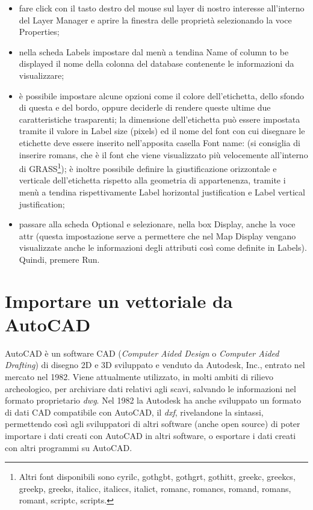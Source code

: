 		\begin{itemize}
			\item fare click con il tasto destro del mouse sul layer di nostro interesse all'interno del Layer Manager e aprire la finestra delle proprietà selezionando la voce \textsf{Properties};
			\item nella scheda \textsf{Labels} impostare dal menù a tendina \textsf{Name of column to be displayed} il nome della colonna del database contenente le informazioni da visualizzare;
			\item è possibile impostare alcune opzioni come il colore dell'etichetta, dello sfondo di questa e del bordo, oppure deciderle di rendere queste ultime due caratteristiche trasparenti; la dimensione dell'etichetta può essere impostata tramite il valore in \textsf{Label size (pixels)} ed il nome del font con cui disegnare le etichette deve essere inserito nell'apposita casella \textsf{Font name:} (si consiglia di inserire \textsf{romans}, che è il font che viene visualizzato più velocemente all'interno di GRASS\footnote{Altri font disponibili sono cyrilc, gothgbt, gothgrt, gothitt, greekc, greekcs, greekp, greeks, italicc, italiccs, italict, romanc, romancs, romand, romans, romant, scriptc, scripts.}); è inoltre possibile definire la giustificazione orizzontale e verticale dell'etichetta rispetto alla geometria di appartenenza, tramite i menù a tendina rispettivamente \textsf{Label horizontal justification} e \textsf{Label vertical justification};
			\item passare alla scheda \textsf{Optional} e selezionare, nella box \textsf{Display}, anche la voce \textsf{attr} (questa impostazione serve a permettere che nel Map Display vengano visualizzate anche le informazioni degli attributi così come definite in \textsf{Labels}). Quindi, premere \textsf{Run}.
		\end{itemize}

\section{Importare un vettoriale da AutoCAD}
	AutoCAD è un software CAD (\emph{Computer Aided Design} o \emph{Computer Aided Drafting}) di disegno 2D e 3D sviluppato e venduto da Autodesk, Inc., entrato nel mercato nel 1982. Viene attualmente utilizzato, in molti ambiti di rilievo archeologico, per archiviare dati relativi agli scavi, salvando le informazioni nel formato proprietario \emph{dwg}. Nel 1982 la Autodesk ha anche sviluppato un formato di dati CAD compatibile con AutoCAD, il \emph{dxf}, rivelandone la sintassi, permettendo così agli sviluppatori di altri software (anche open source) di poter importare i dati creati con AutoCAD in altri software, o esportare i dati creati con altri programmi su AutoCAD.

